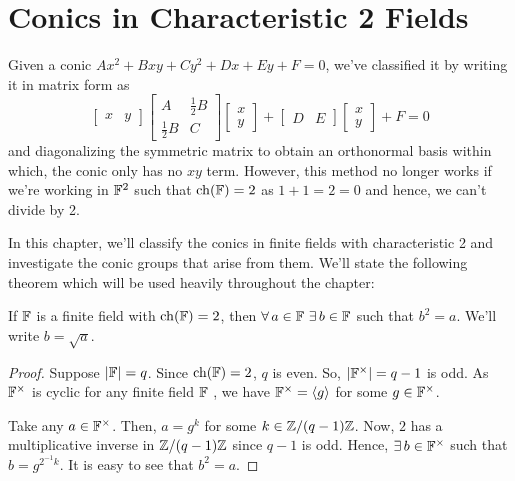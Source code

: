 \chapter{Conics in Characteristic 2 Fields} \label{ch:char2}

Given a conic $Ax^2 + Bxy + Cy^2 + Dx + Ey + F = 0$, we've classified it by
writing it in matrix form as
\[
    \begin{bmatrix}x & y\end{bmatrix}
    \begin{bmatrix}A & \frac{1}{2}B \\ \frac{1}{2}B & C\end{bmatrix}
    \begin{bmatrix}x \\ y\end{bmatrix}
    +
    \begin{bmatrix}D & E\end{bmatrix}
    \begin{bmatrix}x \\ y\end{bmatrix}
    + F = 0
\]
and diagonalizing the symmetric matrix to obtain an orthonormal basis within
which, the conic only has no $xy$ term. However, this method no longer works if
we're working in $\mathbb{F}^2$ such that $\operatorname{ch}(\mathbb{F})=2$ as $1+1=2=0$ and hence, we
can't divide by 2.

\vspace{1ex}

In this chapter, we'll classify the conics in finite fields with characteristic 2
and investigate the conic groups that arise from them. We'll state the following
theorem which will be used heavily throughout the chapter:

\begin{theorem} \label{thm:field_sq}
    If $\mathbb{F}$ is a finite field with $\operatorname{ch}(\mathbb{F})=2$, then
    $\forall\,a\in\mathbb{F}\ \exists\,b\in\mathbb{F}$ such that $b^2=a$. We'll write
    $b=\sqrt{a}$.
\end{theorem}

\begin{proof}
    Suppose $|\mathbb{F}|=q$. Since $\operatorname{ch}(\mathbb{F})=2$, $q$ is even. So, $|\mathbb{F}^\times|=q-1$ is
    odd. As $\mathbb{F}^\times$ is cyclic for any finite field $\mathbb{F}$
    \cite[Prop.~9.18]{dummit}, we have $\mathbb{F}^\times=\langle g \rangle$ for some
    $g\in\mathbb{F}^\times$.
    \vspace{1ex}

    Take any $a\in\mathbb{F}^\times$. Then, $a=g^k$ for some $k\in\mathbb{Z}/(q-1)\mathbb{Z}$. Now, $2$
    has a multiplicative inverse in $\mathbb{Z}/(q-1)\mathbb{Z}$ since $q-1$ is odd. Hence,
    $\exists\,b\in\mathbb{F}^\times$ such that $b=g^{2^{-1}k}$. It is easy to see that
    $b^2=a$.
\end{proof}

